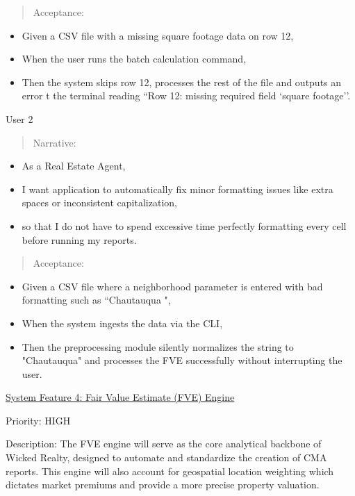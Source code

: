 \begin{quote}
Acceptance:
\end{quote}

\begin{itemize}
\item
  Given a CSV file with a missing square footage data on row 12,
\item
  When the user runs the batch calculation command,
\item
  Then the system skips row 12, processes the rest of the file and
  outputs an error t the terminal reading ``Row 12: missing required
  field `square footage''.
\end{itemize}

User 2

\begin{quote}
Narrative:
\end{quote}

\begin{itemize}
\item
  As a Real Estate Agent,
\item
  I want application to automatically fix minor formatting issues like
  extra spaces or inconsistent capitalization,
\item
  so that I do not have to spend excessive time perfectly formatting
  every cell before running my reports.
\end{itemize}

\begin{quote}
Acceptance:
\end{quote}

\begin{itemize}
\item
  Given a CSV file where a neighborhood parameter is entered with bad
  formatting such as ``Chautauqua ",
\item
  When the system ingests the data via the CLI,
\item
  Then the preprocessing module silently normalizes the string to
  "Chautauqua" and processes the FVE successfully without interrupting
  the user.
\end{itemize}

\ul{System Feature 4: Fair Value Estimate (FVE) Engine}

Priority: HIGH

Description: The FVE engine will serve as the core analytical backbone
of Wicked Realty, designed to automate and standardize the creation of
CMA reports. This engine will also account for geospatial location
weighting which dictates market premiums and provide a more precise
property valuation.


